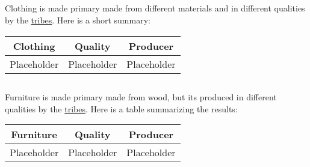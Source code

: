 \subsection{}\label{ch:Goods:Merchandise:Clothing}

\Gls{Clothing} is made primary made from different materials and in different qualities by the
\hyperref[ch:Tribes]{tribes}. Here is a short summary:

\begin{longtable}{ccc}
	\toprule
	\Gls*{Clothing} & Quality     & Producer    \\
	\midrule
	Placeholder     & Placeholder & Placeholder \\
	\bottomrule
\end{longtable}

\subsection{}\label{ch:Goods:Merchandise:Furniture}

\Gls{Furniture} is made primary made from wood, but its produced in different qualities by the
\hyperref[ch:Tribes]{tribes}. Here is a table summarizing the results:

\begin{longtable}{ccc}
	\toprule
	\Gls{Furniture} & Quality     & Producer    \\
	\midrule
	Placeholder     & Placeholder & Placeholder \\
	\bottomrule
\end{longtable}
